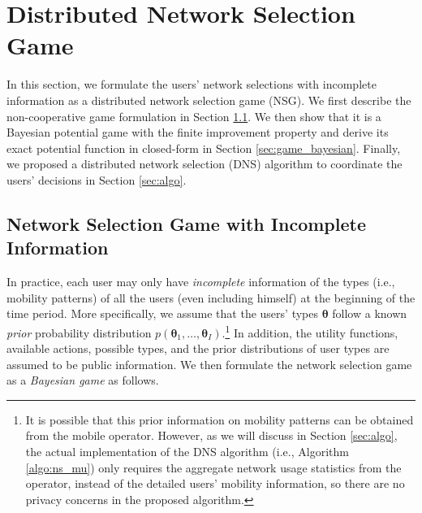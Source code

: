 \documentclass[journal]{IEEEtran}
\newcommand{\bs}[1]{\boldsymbol{#1}}
\begin{document}
\section{Distributed Network Selection Game} \label{sec:game}

  In this section, we formulate the users' network selections with incomplete information as a distributed network selection game (NSG).
	We first describe the non-cooperative game formulation in Section \ref{sec:game_incompleteinfo}.
	We then show that it is a Bayesian potential game with the finite improvement property and derive its exact potential function in closed-form in Section \ref{sec:game_bayesian}.
	Finally, we proposed a distributed network selection (DNS) algorithm to coordinate the users' decisions in Section \ref{sec:algo}.

\subsection{Network Selection Game with Incomplete Information} \label{sec:game_incompleteinfo}

  In practice, each user may only have \emph{incomplete} information of the types (i.e., mobility patterns) of all the users (even including himself) at the beginning of the time period. 
	More specifically, we assume that the users' types $\bs{\theta}$ follow a known \emph{prior} probability distribution $p(\boldsymbol{\theta}_1,\dots,\boldsymbol{\theta}_I)$.\footnote{It is possible that this prior information on mobility patterns can be obtained from the mobile operator. However, as we will discuss in Section \ref{sec:algo}, the actual implementation of the DNS algorithm (i.e., Algorithm \ref{algo:ns_mu}) only requires the aggregate network usage statistics from the operator, instead of the detailed users' mobility information, so there are no privacy concerns in the proposed algorithm.} 
	In addition, the utility functions, available actions, possible types, and the prior distributions of user types are assumed to be public information.
	We then formulate the network selection game as a \emph{Bayesian game} \cite{shoham_ma08} as follows.
\end{document}
